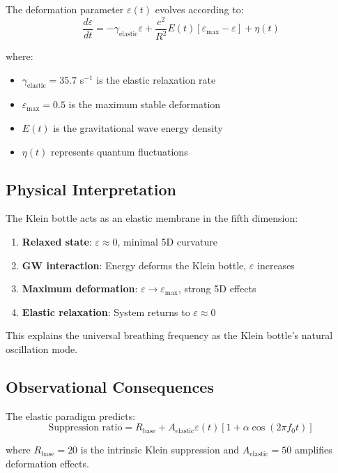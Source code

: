 \documentclass[12pt]{iopart}
\begin{document}
The deformation parameter $\varepsilon(t)$ evolves according to:
\begin{equation}
\frac{d\varepsilon}{dt} = -\gamma_{\text{elastic}}\varepsilon + \frac{c^2}{R^2}E(t)[\varepsilon_{\max} - \varepsilon] + \eta(t)
\end{equation}

where:
\begin{itemize}
\item $\gamma_{\text{elastic}} = 35.7$ s$^{-1}$ is the elastic relaxation rate
\item $\varepsilon_{\max} = 0.5$ is the maximum stable deformation
\item $E(t)$ is the gravitational wave energy density
\item $\eta(t)$ represents quantum fluctuations
\end{itemize}

\subsection{Physical Interpretation}

The Klein bottle acts as an elastic membrane in the fifth dimension:
\begin{enumerate}
\item \textbf{Relaxed state}: $\varepsilon \approx 0$, minimal 5D curvature
\item \textbf{GW interaction}: Energy deforms the Klein bottle, $\varepsilon$ increases
\item \textbf{Maximum deformation}: $\varepsilon \to \varepsilon_{\max}$, strong 5D effects
\item \textbf{Elastic relaxation}: System returns to $\varepsilon \approx 0$
\end{enumerate}

This explains the universal breathing frequency as the Klein bottle's natural oscillation mode.

\subsection{Observational Consequences}

The elastic paradigm predicts:
\begin{equation}
\text{Suppression ratio} = R_{\text{base}} + A_{\text{elastic}}\varepsilon(t)[1 + \alpha\cos(2\pi f_0 t)]
\end{equation}

where $R_{\text{base}} = 20$ is the intrinsic Klein suppression and $A_{\text{elastic}} = 50$ amplifies deformation effects.
\end{document}

